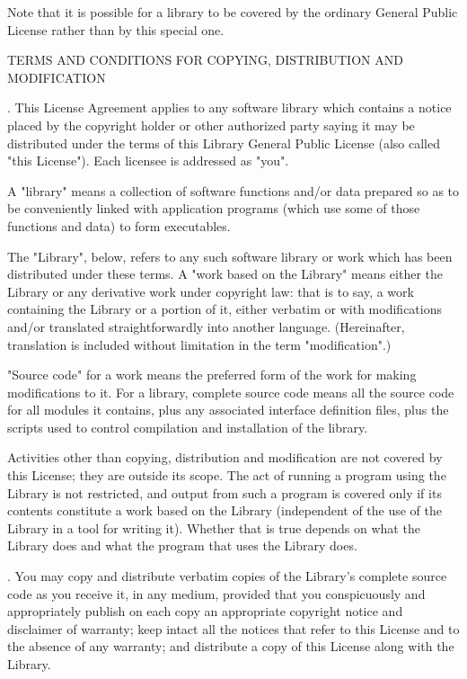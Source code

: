 Note that it is possible for a library to be covered by the ordinary General Public License rather than by this special one. 

\vparasmall
TERMS AND CONDITIONS FOR COPYING, DISTRIBUTION AND MODIFICATION

. This License Agreement applies to any software library which contains a notice placed by the copyright holder or other authorized party saying it may be distributed under the terms of this Library General Public License (also called "this License"). Each licensee is addressed as "you". 

A "library" means a collection of software functions and/or data prepared so as to be conveniently linked with application programs (which use some of those functions and data) to form executables. 

The "Library", below, refers to any such software library or work which has been distributed under these terms. A "work based on the Library" means either the Library or any derivative work under copyright law: that is to say, a work containing the Library or a portion of it, either verbatim or with modifications and/or translated straightforwardly into another language. (Hereinafter, translation is included without limitation in the term "modification".) 

"Source code" for a work means the preferred form of the work for making modifications to it. For a library, complete source code means all the source code for all modules it contains, plus any associated interface definition files, plus the scripts used to control compilation and installation of the library. 

Activities other than copying, distribution and modification are not covered by this License; they are outside its scope. The act of running a program using the Library is not restricted, and output from such a program is covered only if its contents constitute a work based on the Library (independent of the use of the Library in a tool for writing it). Whether that is true depends on what the Library does and what the program that uses the Library does. 

. You may copy and distribute verbatim copies of the Library's complete source code as you receive it, in any medium, provided that you conspicuously and appropriately publish on each copy an appropriate copyright notice and disclaimer of warranty; keep intact all the notices that refer to this License and to the absence of any warranty; and distribute a copy of this License along with the Library. 

